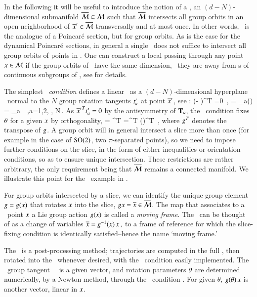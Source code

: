 \documentclass[final,number,sort&compress]{elsarticle}
\begin{document}
In the following it will be useful to introduce the notion of
a \emph{\slice}, an $(d-N)$-dimensional submanifold
$\overline{\cal M}\subset{\cal M}$ such that $\overline{\cal M}$ intersects all group
orbits in an open neighborhood of ${\overline{x}'} \in \overline{\cal M}$
transversally and at most once. In other words, \slice\ is
the analogue of a Poincar\'e section, but for group orbits.
As is the case for the dynamical Poincar\'e sections, in
general a single \slice\ does not suffice to intersect all
group orbits of points in \pS. One can construct a local {\slice} passing
through any point $x\in {\cal M}$ if the group orbits of \Group\
have the same dimension, \ie\ {they are} away from {\fixedsp
s} of continuous subgroups of \Group, see
 for details.

The simplest {\em \slice\ condition} defines a linear \slice\ as a
$(d\!-\!N)$-dim\-ens\-ion\-al hyperplane \pSRed\ normal to
the $N$ group rotation tangents $t'_{a}$ at point ${\overline{x}'}$,
see \reffig{fig:ReducTraj}:
\beq
(\sspRed - \slicep )^T  =0
    \,,\qquad
{} = \groupTan_a(\slicep) = \Lg_a \, \slicep
\,,\qquad a=1,2, \cdots, N\,.
As ${\overline{x}'}^T t'_{a} =0$ by the antisymmetry of
$\mathbf{T}_a$, the \slice\ condition  fixes
${\bf \theta}$ for a given $x$ by orthogonality,
 = \sspRed^T  
	=\ssp^T  \LieEl(\gSpace)^T 
\,,
where $g^T$ denotes the transpose of $g$. A group
orbit will in general intersect a slice more than once (for
example in the case of $\textrm{SO}(2)$, two $\pi$-separated
points), so we need to impose further conditions on the
slice, in the form of either inequalities or orientation
conditions, so as to ensure unique intersection. These
restrictions are rather arbitrary, the only requirement being
that $\overline{\cal M}$ remains a connected manifold. We illustrate
this point for the \cLf\ example in .

For group orbits intersected by a slice, we can identify the
unique group element $g=g(x)$ that rotates
$x$ into the slice, $gx = \overline{x} \in \overline{\cal M}$. The
map that associates to a \statesp\ point $x$ a Lie group
action $g(x)$ is called a \emph{moving frame}.
The \mframes\ can be thought of as a change of variables
$
\overline{x} = g^{-1}(x) \, x
\,,
$ to a frame of reference for which the slice-fixing condition
 is identically satisfied--hence the name
`moving frame.'

The \mframes\ is a post-processing method; trajectories are
computed in the full \statesp, then rotated into the \slice\
whenever desired, with the \slice\ condition easily
implemented. The \slice\ group tangent \sliceTan\ \, is a
given vector, and rotation parameters ${\bf \theta}$ are
determined numerically, by a Newton method, through the
\slice\ condition \refeq{PCsectQ1}. For given $\theta$,
$g({\bf \theta})\,x$ is another vector, linear in $x$.
\end{document}
